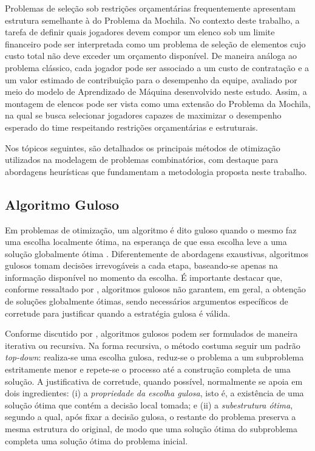 Problemas de seleção sob restrições orçamentárias frequentemente apresentam estrutura semelhante à do Problema da Mochila. No contexto deste
trabalho, a tarefa de definir quais jogadores devem compor um elenco sob um limite financeiro pode ser interpretada como um problema de seleção
de elementos cujo custo total não deve exceder um orçamento disponível. De maneira análoga ao problema clássico, cada jogador pode ser associado
a um custo de contratação e a um valor estimado de contribuição para o desempenho da equipe, avaliado por meio do modelo de Aprendizado de Máquina
desenvolvido neste estudo. Assim, a montagem de elencos pode ser vista como uma extensão do Problema da Mochila, na qual se busca selecionar
jogadores capazes de maximizar o desempenho esperado do time respeitando restrições orçamentárias e estruturais.

Nos tópicos seguintes, são detalhados os principais métodos de otimização utilizados na modelagem de problemas combinatórios, com destaque para abordagens heurísticas 
que fundamentam a metodologia proposta neste trabalho.

\subsection{Algoritmo Guloso}

Em problemas de otimização, um algoritmo é dito guloso quando o mesmo faz uma escolha localmente ótima, na esperança de que essa escolha leve a uma solução
globalmente ótima \cite{Cormen2009}. Diferentemente de abordagens exaustivas, algoritmos gulosos tomam decisões irrevogáveis a cada etapa, baseando-se
apenas na informação disponível no momento da escolha. É importante destacar que, conforme ressaltado por \cite{Cormen2009}, 
algoritmos gulosos não garantem, em geral, a obtenção de soluções globalmente ótimas, sendo necessários argumentos específicos de corretude para justificar
quando a estratégia gulosa é válida.

Conforme discutido por \cite{Cormen2009}, algoritmos gulosos podem ser formulados de maneira iterativa ou recursiva. Na forma recursiva, o método costuma
seguir um padrão \textit{top-down}: realiza-se uma escolha gulosa, reduz-se o problema a um subproblema estritamente menor e repete-se o processo até a
construção completa de uma solução. A justificativa de corretude, quando possível, normalmente se apoia em dois ingredientes: (i) a \textit{propriedade da
escolha gulosa}, isto é, a existência de uma solução ótima que contém a decisão local tomada; e (ii) a \textit{subestrutura ótima}, segundo a qual, após
fixar a decisão gulosa, o restante do problema preserva a mesma estrutura do original, de modo que uma solução ótima do subproblema completa uma solução
ótima do problema inicial.

